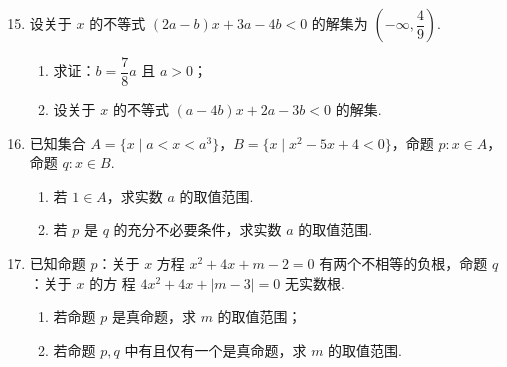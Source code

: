 \documentclass[a4paper,11pt]{article}
\begin{document}
\begin{enumerate}
\setcounter{enumi}{14}

\item 设关于 $x$ 的不等式 $(2a-b)x+3a-4b<0$ 的解集为 $\left(-\infty,\dfrac49\right)$.

\begin{enumerate}[label=(\arabic*)]
\item 求证：$b=\dfrac78a$ 且 $a>0$；
\item 设关于 $x$ 的不等式 $(a-4b)x+2a-3b<0$ 的解集.
\end{enumerate}

\ifanswer
\solbegin
{}
\solend

\fi

\ansspace[6]

\item 已知集合 $A=\{x\mid a<x<a^3\}$，$B=\{x\mid x^2-5x+4<0\}$，命题 $p:x\in A$，命题 $q:x\in B$.

\begin{enumerate}[label=(\arabic*)]
\item 若 $1\in A$，求实数 $a$ 的取值范围.
\item 若 $p$ 是 $q$ 的充分不必要条件，求实数 $a$ 的取值范围.
\end{enumerate}

\ifanswer
\solbegin
{}
\stepm{(2)}{$(-\infty,-1]\cup\left[0,\sqrt[3]{4}\right]$}
\solend

\fi

\ansspace[6]

\item 已知命题 $p$：关于 $x$ 方程 $x^2+4x+m-2=0$ 有两个不相等的负根，命题 $q$：关于 $x$ 的方
程 $4x^2+4x+|m-3|=0$ 无实数根.

\begin{enumerate}[label=(\arabic*)]
\item 若命题 $p$ 是真命题，求 $m$ 的取值范围；
\item 若命题 $p,q$ 中有且仅有一个是真命题，求 $m$ 的取值范围.
\end{enumerate}

\ifanswer
\solbegin
{}
\stepm{(2)}{$(-\infty,2)\cup(2,4]\cup[6,+\infty)$}
\solend


\end{enumerate}
\end{document}
